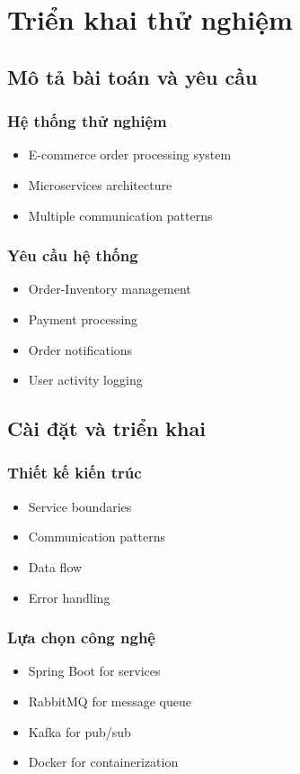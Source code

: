 \chapter{Triển khai thử nghiệm}

\section{Mô tả bài toán và yêu cầu}
\subsection{Hệ thống thử nghiệm}
\begin{itemize}
    \item E-commerce order processing system
    \item Microservices architecture
    \item Multiple communication patterns
\end{itemize}

\subsection{Yêu cầu hệ thống}
\begin{itemize}
    \item Order-Inventory management
    \item Payment processing
    \item Order notifications
    \item User activity logging
\end{itemize}

\section{Cài đặt và triển khai}
\subsection{Thiết kế kiến trúc}
\begin{itemize}
    \item Service boundaries
    \item Communication patterns
    \item Data flow
    \item Error handling
\end{itemize}

\subsection{Lựa chọn công nghệ}
\begin{itemize}
    \item Spring Boot for services
    \item RabbitMQ for message queue
    \item Kafka for pub/sub
    \item Docker for containerization
\end{itemize}

